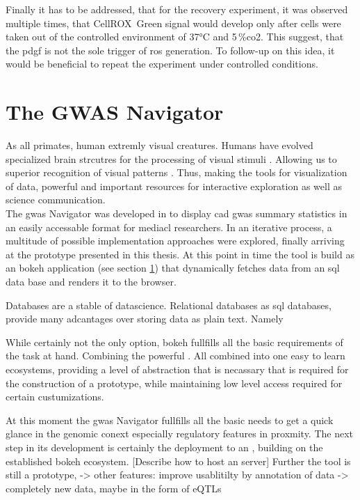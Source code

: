Finally it has to be addressed, that for the recovery experiment, it was observed multiple times, that CellROX\texttrademark~Green signal would develop only after cells were taken out of the controlled environment of 37°C and 5\,\%\ac{co2}. This suggest, that the \ac{pdgf} is not the sole trigger of \ac{ros} generation. To follow-up on this idea, it would be beneficial to repeat the experiment under controlled conditions.


\section{The GWAS Navigator}
As all primates, human extremly visual creatures. Humans have evolved specialized brain strcutres for the processing of visual stimuli \cite{https://www.ncbi.nlm.nih.gov/pmc/articles/PMC4574956/}. Allowing us to superior recognition of visual patterns \cite{https://www.ncbi.nlm.nih.gov/pmc/articles/PMC4141622/}. Thus, making the tools for visualization of data, powerful and important resources for interactive exploration as well as science communication.\\
The \ac{gwas} Navigator was developed in to display \ac{cad} \ac{gwas} summary statistics in an easily accessable format for mediacl researchers. In an iterative process, a multitude of possible implementation approaches were explored, finally arriving at the prototype presented in this thesis. At this point in time the tool is build as an bokeh application (see section \ref{}) that dynamically fetches data from an \ac{sql} data base and renders it to the browser.

Databases are a stable of datascience. Relational databases as \ac{sql} databases, provide many adcantages over storing data as plain text. Namely

While certainly not the only option, bokeh fullfills all the basic requirements of the task at hand. Combining the powerful . All combined into one easy to learn ecosystems, providing a level of abstraction that is necassary that is required for the construction of a prototype, while maintaining low level access required for certain custumizations.

At this moment the \ac{gwas} Navigator fullfills all the basic needs to get a quick glance in the genomic conext  especially regulatory features in proxmity. The next step in its development is certainly the deployment to an , building on the established bokeh ecosystem. [Describe how to host an server] Further the tool is still a prototype,
-> other features: improve usablitilty by annotation of data
-> completely new data, maybe in the form of eQTLs


